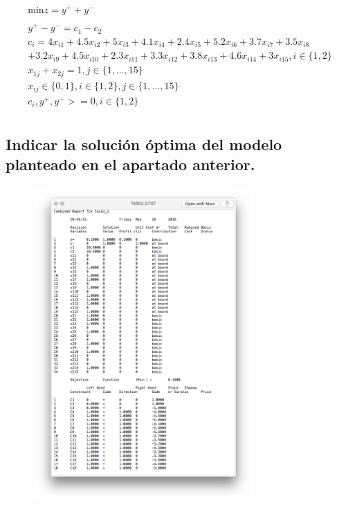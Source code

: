 \documentclass[10pt, a4paper]{article}
\begin{document}
			\[
				\begin{split}
					\text{min} z = y^{+} + y^{-} \\ \\
						y^{+} - y^{-} = c_1 - c_2 \\
						c_i = 4x_{i1} + 4.5x_{i2} + 5x_{i3} + 4.1x_{i4} + 2.4x_{i5} + 5.2x_{i6} + 3.7x_{i7} + 3.5x_{i8} \\
						+ 3.2x_{i9} + 4.5x_{i10} + 2.3x_{i11} + 3.3x_{i12} + 3.8x_{i13} + 4.6x_{i14} + 3x_{i15}, i \in \{1,2\}\\
						x_{1j} + x_{2j} = 1, j \in \{1,...,15\} \\
						x_{ij} \in \{0,1\}, i \in \{1,2\},j \in \{1,...,15\} \\
						c_{i}, y^{+}, y^{-} >= 0, i \in \{1,2\}\\
				\end{split}
			\]
		\subsection{Indicar la solución óptima del modelo planteado en el apartado anterior.}

			\paragraph{}
			\begin{figure}[H]

			\centering
	            \includegraphics[width=0.75\textwidth]{res/exercise-3-result.png}
	        \end{figure}
\end{document}
